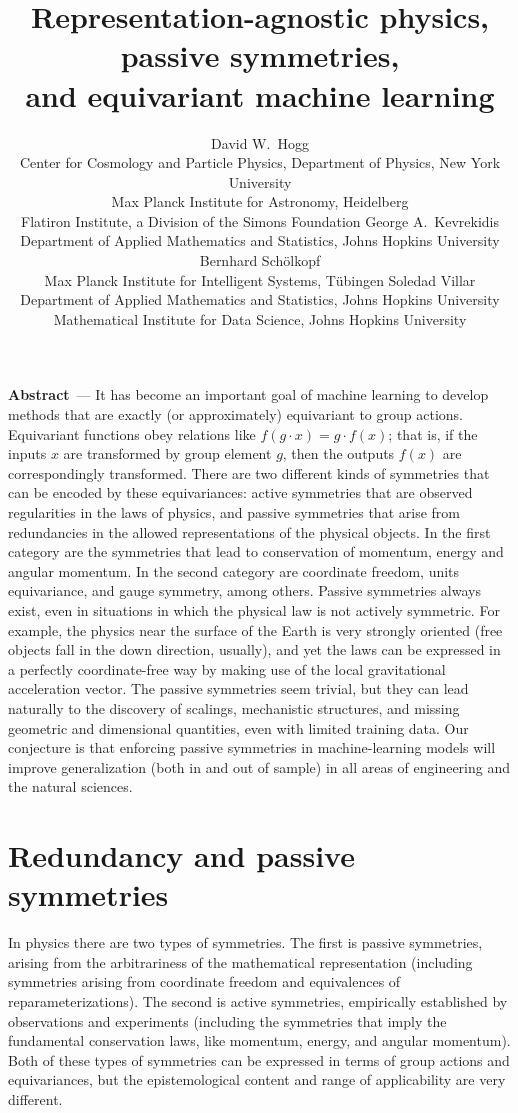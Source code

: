 \documentclass{article}
\title{Representation-agnostic physics, passive symmetries,\\ and equivariant machine learning}
\author{%
  David W.~Hogg\\
 Center for Cosmology and Particle Physics, Department of Physics, New York University\\
Max Planck Institute for Astronomy, Heidelberg\\
Flatiron Institute, a Division of the Simons Foundation
  \And
George A.~Kevrekidis\\
 Department of Applied Mathematics and Statistics, Johns Hopkins University
   \And
  Bernhard Sch\"olkopf\\
  Max Planck Institute for Intelligent Systems, T\"ubingen
  \And
  Soledad Villar\\
  Department of Applied Mathematics and Statistics, Johns Hopkins University\\
  Mathematical Institute for Data Science, Johns Hopkins University
}
\renewcommand{\paragraph}[1]{\par\textbf{#1}~---}
\begin{document}
\maketitle

\paragraph{Abstract} 
It has become an important goal of machine learning to develop methods that are exactly (or approximately) equivariant to group actions.
Equivariant functions obey relations like $f(g\cdot x) = g\cdot f(x)$; that is, if the inputs $x$ are transformed by group element $g$, then the outputs $f(x)$ are correspondingly transformed.
There are two different kinds of symmetries that can be encoded by these equivariances: active symmetries that are observed regularities in the laws of physics, and passive symmetries that arise from redundancies in the allowed representations of the physical objects. 
In the first category are the symmetries that lead to conservation of momentum, energy and angular momentum. In the second category are coordinate freedom, units equivariance, and gauge symmetry, among others.  
Passive symmetries always exist, even in situations in which the physical law is not actively symmetric.
For example, the physics near the surface of the Earth is very strongly oriented (free objects fall in the down direction, usually), and yet the laws can be expressed in a perfectly coordinate-free way by making use of the local gravitational acceleration vector.
The passive symmetries seem trivial, but they can lead naturally to the discovery of scalings, mechanistic structures, and missing geometric and dimensional quantities, even with limited training data.
Our conjecture is that enforcing passive symmetries in machine-learning models will improve generalization (both in and out of sample) in all areas of engineering and the natural sciences.

\section{Redundancy and passive symmetries}

In physics there are two types of symmetries. 
The first is passive symmetries, arising from the arbitrariness of the mathematical representation (including symmetries arising from coordinate freedom and equivalences of reparameterizations).
The second is active symmetries, empirically established by observations and experiments (including the symmetries that imply the fundamental conservation laws, like momentum, energy, and angular momentum). Both of these types of symmetries can be expressed in terms of group actions and equivariances, but the epistemological content and range of applicability are very different. 
\end{document}
